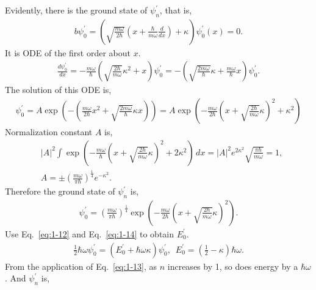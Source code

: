 \documentclass[floatfix,nofootinbib,superscriptaddress,fleqn]{revtex4-2}
\begin{document}
\begin{itemize}
    Evidently, there is the ground state of $\psi_n^\prime$, that is,
    \begin{align}\label{eq:1-14}
      b\psi_0^\prime=
      \left(\sqrt{\frac{m\omega}{2\hbar}}\left(x+\frac{\hbar}{m\omega}
      \frac{d}{dx}\right)+\kappa\right)
      \psi_0^\prime(x)=0.
    \end{align}
    It is ODE of the first order about $x$.
    \begin{align*}
      \frac{d\psi_0^\prime}{dx}
      =-\frac{m\omega}{\hbar}
      \left(
        \sqrt{\frac{2\hbar}{m\omega}}
      \kappa^2+x
      \right)
      \psi_0^\prime
      =-\left(
        \sqrt{\frac{2m\omega}{\hbar}}
        \kappa+\frac{m\omega}{\hbar}x
        \right)
        \psi_0^\prime.
    \end{align*}
     The solution of this ODE is,    
    \begin{align*}
      \psi_0^\prime = A\exp{\left(-\left(\frac{m\omega}{2\hbar}x^2
      +\sqrt{\frac{2m\omega}{\hbar}}\kappa x\right)\right)}
      =A\exp{\left(
        -\frac{m\omega}{2\hbar}{\left(
          x +\sqrt{\frac{2\hbar}{m\omega}}\kappa
        \right)}^2+\kappa^2
      \right)}  
    \end{align*}
    Normalization constant $A$ is,
    \begin{align}
      &|A|^2\int\exp{\left(
        -\frac{m\omega}{\hbar}{\left(
          x +\sqrt{\frac{2\hbar}{m\omega}}\kappa
        \right)}^2+2\kappa^2
      \right)}\,dx
      =|A|^2e^{2\kappa^2}\sqrt{\frac{\pi\hbar}{m\omega}}
      =1, \\
      &A = \pm \left(\frac{m\omega}{\pi\hbar}\right)
      ^{\frac{1}{4}}e^{-\kappa^2}.
    \end{align}
    Therefore the ground state of $\psi_n^\prime$ is,
    \begin{align*}
      \psi_0^\prime = \left(\frac{m\omega}{\pi\hbar}\right)
      ^{\frac{1}{4}}
      \exp{\left(-\frac{m\omega}{2\hbar}
      {\left(x +\sqrt{\frac{2\hbar}{m\omega}}\kappa\right)}
        ^2\right)}.
    \end{align*}
    Use Eq.~\eqref{eq:1-12} and Eq.~\eqref{eq:1-14} to obtain $E_0^\prime$.
    \begin{align}
      \frac{1}{2}\hbar\omega\psi^\prime_0 
    = \left(E^\prime_0+\hbar\omega\kappa\right)
    \psi^\prime_0,\,\,\,
    E_0^\prime = \left(\frac{1}{2}-\kappa\right)
    \hbar\omega.
    \end{align}
    From the application of Eq.~\eqref{eq:1-13}, as $n$ increases by 1, 
    so does energy by a $\hbar\omega$. And $\psi_n^\prime$ is,

\end{itemize}
\end{document}
